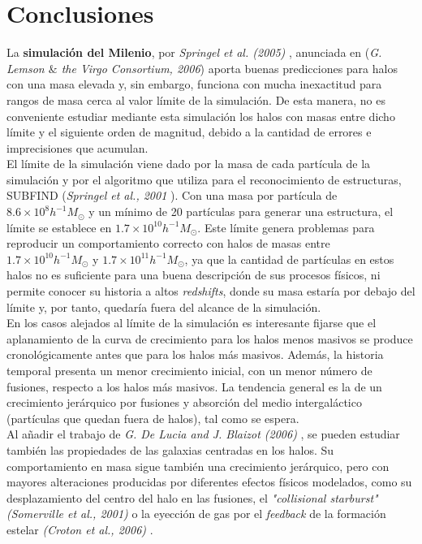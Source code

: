 \section{Conclusiones} 
\label{sec:4}

La \textbf{simulación del Milenio}\cite{6}, por \textit{Springel et al. (2005)} \cite{1}, anunciada en (\textit{G. Lemson $\&$ the Virgo Consortium, 2006}\cite{5}) aporta buenas predicciones para halos con una masa elevada y, sin embargo, funciona con mucha inexactitud para rangos de masa cerca al valor límite de la simulación. De esta manera, no es conveniente estudiar mediante esta simulación los halos con masas entre dicho límite y el siguiente orden de magnitud, debido a la cantidad de errores e imprecisiones que acumulan. \\

El límite de la simulación viene dado por la masa de cada partícula de la simulación y por el algoritmo que utiliza para el reconocimiento de estructuras, SUBFIND (\textit{Springel et al., 2001} \cite{8}). Con una masa por partícula de $8.6\times10^{8}h^{-1}M_\odot$ y un mínimo de 20 partículas para generar una estructura, el límite se establece en $1.7\times10^{10}h^{-1}M_\odot$. Este límite genera problemas para reproducir un comportamiento correcto con halos de masas entre  $1.7\times10^{10}h^{-1}M_{\odot}$ y $1.7\times10^{11}h^{-1}M_\odot$, ya que la cantidad de partículas en estos halos no es suficiente para una buena descripción de sus procesos físicos, ni permite conocer su historia a altos \textit{redshifts}, donde su masa estaría por debajo del límite y, por tanto, quedaría fuera del alcance de la simulación. \\

En los casos alejados al límite de la simulación es interesante fijarse que el aplanamiento de la curva de crecimiento para los halos menos masivos se produce cronológicamente antes que para los halos más masivos. Además, la historia temporal presenta un menor crecimiento inicial, con un menor número de fusiones, respecto a los halos más masivos. La tendencia general es la de un crecimiento jerárquico por fusiones y absorción del medio intergaláctico (partículas que quedan fuera de halos), tal como se espera. \\

Al añadir el trabajo de \textit{G. De Lucia and J. Blaizot (2006)} \cite{2}, se pueden estudiar también las propiedades de las galaxias centradas en los halos. Su comportamiento en masa sigue también una crecimiento jerárquico, pero con mayores alteraciones producidas por diferentes efectos físicos modelados, como su desplazamiento del centro del halo en las fusiones, el \textit{"collisional starburst" (Somerville et al., 2001)} \cite{3} o la eyección de gas por el \textit{feedback} de la formación estelar \textit{(Croton et al., 2006)} \cite{10}. \\

